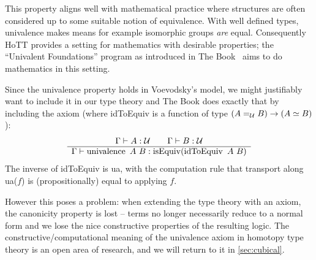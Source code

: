 This property aligns well with mathematical practice where structures are often
considered up to some suitable notion of equivalence. With well defined types,
univalence makes means for example isomorphic groups \emph{are} equal.
Consequently HoTT provides a setting for mathematics with desirable properties; the ``Univalent
Foundations'' program as introduced in The Book~\cite{hottbook} aims to do
mathematics in this setting.

Since the univalence property holds in Voevodsky's model, we might justifiably want to
include it in our type theory and The Book does exactly that by including the
axiom (where idToEquiv is a function of type $(A =_{\mathcal{U}} B) \rightarrow (A
\simeq B)$):
\begin{equation*}
  \begin{array}[t]{c}
    \Gamma \vdash A : \mathcal{U} \qquad \Gamma \vdash B : \mathcal{U}\\
    \hline
    \Gamma \vdash \operatorname{univalence}~A~B : \operatorname{isEquiv} (\operatorname{idToEquiv}~A~B)
  \end{array}
\end{equation*}
The inverse of idToEquiv is ua, with the computation rule that transport along
ua($f$) is (propositionally) equal to applying $f$.

However this poses a problem: when extending the
type theory with an axiom, the canonicity property is lost -- terms no longer
necessarily reduce to a normal form and we lose the nice constructive properties
of the resulting logic. The constructive/computational meaning of the univalence
axiom in homotopy type theory is an open area of research, and we will return to
it in \autoref{sec:cubical}.